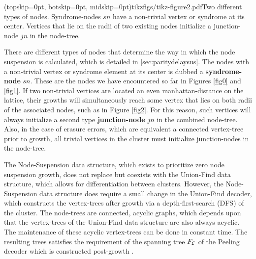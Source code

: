 \Figure[htb](topskip=0pt, botskip=0pt, midskip=0pt){tikzfigs/tikz-figure2.pdf}{Two different types of nodes. Syndrome-nodes $sn$ have a non-trivial vertex or syndrome at its center. Vertices that lie on the radii of two existing nodes initialize a junction-node $jn$ in the node-tree.\label{fig2}}

There are different types of nodes that determine the way in which the node suspension is calculated, which is detailed in \ref{sec:paritydelaysus}. The nodes with a non-trivial vertex or syndrome element at its center is dubbed a \textbf{syndrome-node} $sn$. These are the nodes we have encountered so far in Figures \ref{fig0} and \ref{fig1}. If two non-trivial vertices are located an even manhattan-distance on the lattice, their growths will simultaneously reach some vertex that lies on both radii of the associated nodes, such as in Figure \ref{fig2}. For this reason, such vertices will always initialize a second type \textbf{junction-node} $jn$ in the combined node-tree. Also, in the case of erasure errors, which are equivalent a connected vertex-tree prior to growth, all trivial vertices in the cluster must initialize junction-nodes in the node-tree.

The Node-Suspension data structure, which exists to prioritize zero node suspension growth, does not replace but coexists with the Union-Find data structure, which allows for differentiation between clusters. However, the Node-Suspension data structure does require a small change in the Union-Find decoder, which constructs the vertex-trees after growth via a depth-first-search (DFS) of the cluster. The node-trees are connected, acyclic graphs, which depends upon that the vertex-trees of the Union-Find data structure are also always acyclic. The maintenance of these acyclic vertex-trees can be done in constant time. The resulting trees satisfies the requirement of the spanning tree $F_{\mathcal{E}}$ of the Peeling decoder which is constructed post-growth \cite{delfosse2017linear}.
